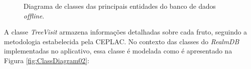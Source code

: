 \begin{figure}[htb]
    \centering
    \caption{Diagrama de classes das principais entidades do banco de dados \textit{offline}.}
    \label{fig:ClassDiagram01}
\end{figure}

\newpage 

A classe \textit{TreeVisit} armazena informações detalhadas sobre cada fruto, seguindo a metodologia estabelecida pela CEPLAC. No contexto das classes do \textit{RealmDB} implementadas no aplicativo, essa classe é modelada como é apresentado na Figura \ref{fig:ClassDiagram02}:

